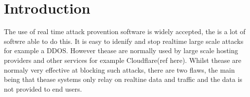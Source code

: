 
\chapter{Introduction}
\newpage
The use of real time attack provention software is widely accepted, the is a lot of softwre able to do this. It is easy to idenify and stop realtime large scale attacks for example a DDOS. However thease are normally used by large scale hosting providers and other services for example Cloudflare(ref here). Whilst thease are normaly very effective at blocking such attacks, there are two flaws, the main being that thease systems only relay on realtine data and traffic and the data is not provided to end users.